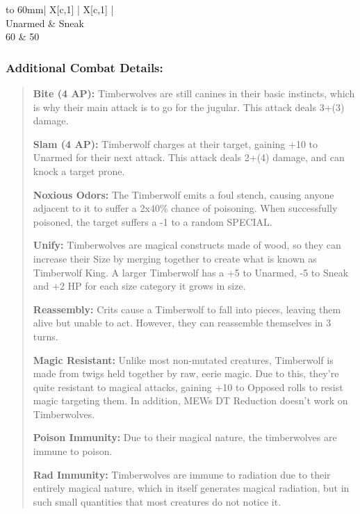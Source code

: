 \documentclass[11pt,a4paper,twocolumn]{book}
\begin{document}
	\bigskip
	{
		\begin{tabu} to 60mm{| X[c,1] | X[c,1] |}
			\hline
			        \\ \hline
			Unarmed & Sneak  \\
			60      & 50         \\ \hline
		\end{tabu}
		
	}
	
	\subsubsection*{Additional Combat Details:}
	\begin{verse}
		\textbf{Bite (4 AP):} Timberwolves are still canines in their basic instincts, which is why their main attack is to go for the jugular. This attack deals 3+(3) damage.
		
		\textbf{Slam (4 AP):} Timberwolf charges at their target, gaining +10 to Unarmed for their next attack. This attack deals 2+(4) damage, and can knock a target prone.
		
		\textbf{Noxious Odors:} The Timberwolf emits a foul stench, causing anyone adjacent to it to suffer a 2x40\% chance of poisoning. When successfully poisoned, the target suffers a -1 to a random SPECIAL.
		
		\textbf{Unify:} Timberwolves are magical constructs made of wood, so they can increase their Size by merging together to create what is known as Timberwolf King. A larger Timberwolf has a +5 to Unarmed, -5 to Sneak and +2 HP for each size category it grows in size.
		
		\textbf{Reassembly:} Crits cause a Timberwolf to fall into pieces, leaving them alive but unable to act. However, they can reassemble themselves in 3 turns.
		
		\textbf{Magic Resistant:} Unlike most non-mutated creatures, Timberwolf is made from twigs held together by raw, eerie magic. Due to this, they're quite resistant to magical attacks, gaining +10 to Opposed rolls to resist magic targeting them. In addition, MEWs DT Reduction doesn't work on Timberwolves.
		
		\textbf{Poison Immunity:} Due to their magical nature, the timberwolves are immune to poison.
		
		\textbf{Rad Immunity:} Timberwolves are immune to radiation due to their entirely magical nature, which in itself generates magical radiation, but in such small quantities that most creatures do not notice it.
	\end{verse}
	
\end{document}
